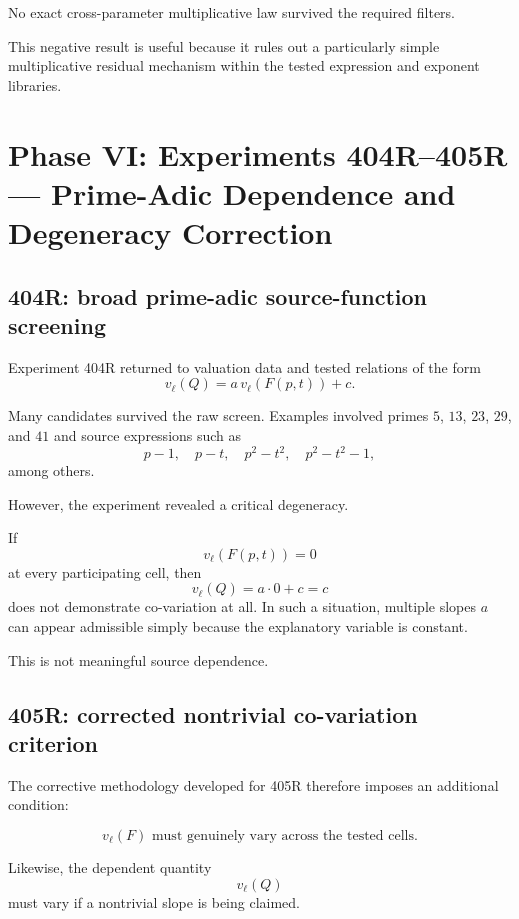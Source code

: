 \documentclass[11pt,a4paper]{article}
\begin{document}
No exact cross-parameter multiplicative law survived the required filters.

This negative result is useful because it rules out a particularly simple multiplicative residual mechanism within the tested expression and exponent libraries.

\section{Phase VI: Experiments 404R--405R --- Prime-Adic Dependence and Degeneracy Correction}

\subsection{404R: broad prime-adic source-function screening}

Experiment 404R returned to valuation data and tested relations of the form
\[
v_\ell(Q)=a\,v_\ell(F(p,t))+c.
\]

Many candidates survived the raw screen. Examples involved primes $5$, $13$, $23$, $29$, and $41$ and source expressions such as
\[
p-1,\quad p-t,\quad p^2-t^2,\quad p^2-t^2-1,
\]
among others.

However, the experiment revealed a critical degeneracy.

If
\[
v_\ell(F(p,t))=0
\]
at every participating cell, then
\[
v_\ell(Q)=a\cdot 0+c=c
\]
does not demonstrate co-variation at all. In such a situation, multiple slopes $a$ can appear admissible simply because the explanatory variable is constant.

This is not meaningful source dependence.

\subsection{405R: corrected nontrivial co-variation criterion}

The corrective methodology developed for 405R therefore imposes an additional condition:

\[
\boxed{
v_\ell(F)\text{ must genuinely vary across the tested cells.}
}
\]

Likewise, the dependent quantity
\[
v_\ell(Q)
\]
must vary if a nontrivial slope is being claimed.
\end{document}
